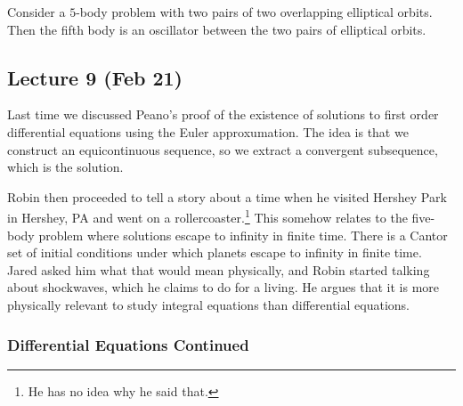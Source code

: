 \documentclass[10pt, twoside]{article}
\begin{document}
    \begin{exm}
        Consider a $5$-body problem with two pairs of two overlapping elliptical orbits. Then the fifth body is an oscillator between the two pairs of elliptical orbits.
    \end{exm}

    \subsection{Lecture 9 (Feb 21)}%
    Last time we discussed Peano's proof of the existence of solutions to first order differential equations using the Euler approxumation. The idea is that we construct an equicontinuous sequence, so we extract a convergent subsequence, which is the solution.

    Robin then proceeded to tell a story about a time when he visited Hershey Park in Hershey, PA and went on a rollercoaster.\footnote{He has no idea why he said that.} This somehow relates to the five-body problem where solutions escape to infinity in finite time. There is a Cantor set of initial conditions under which planets escape to infinity in finite time. Jared asked him what that would mean physically, and Robin started talking about shockwaves, which he claims to do for a living. He argues that it is more physically relevant to study integral equations than differential equations.

    \subsubsection{Differential Equations Continued}%
\end{document}
